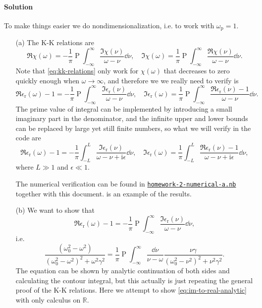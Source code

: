 \documentclass[hyperref, a4paper]{article}
\DeclareMathOperator{\primevalue}{P}
\newcommand*{\ii}{\mathrm{i}}
\begin{document}
\paragraph{Solution} To make things easier we do nondimensionalization, i.e. to work with $\omega_\text{p} = 1$.
\begin{itemize}
    \item[(a)] The K-K relations are
    \begin{equation}
        \Re \chi(\omega) = - \frac{1}{\pi} \primevalue \int_{-\infty}^\infty \frac{\Im \chi(\nu)}{\omega - \nu} \dd{\nu}, \quad \Im \chi(\omega) = \frac{1}{\pi} \primevalue \int_{-\infty}^\infty \frac{\Re \chi(\nu)}{\omega - \nu} \dd{\nu}.
        \label{eq:kk-relations}
    \end{equation}
    Note that \eqref{eq:kk-relations} only work for $\chi(\omega)$ that decreases to zero quickly enough when $\omega \to \infty$, and therefore we we really need to verify is 
    \[
        \Re \epsilon_\text{r}(\omega) - 1 = - \frac{1}{\pi} \primevalue \int_{-\infty}^\infty \frac{\Im \epsilon_\text{r}(\nu)}{\omega - \nu} \dd{\nu}, \quad \Im \epsilon_\text{r}(\omega) = \frac{1}{\pi} \primevalue \int_{-\infty}^\infty \frac{\Re \epsilon_\text{r}(\nu) - 1}{\omega - \nu} \dd{\nu}.
    \]
    The prime value of integral can be implemented by introducing a small imaginary part in the denominator, and the infinite upper and lower bounds can be replaced by large yet still finite numbers, so what we will verify in the code are
    \begin{equation}
        \Re \epsilon_\text{r}(\omega) - 1 = - \frac{1}{\pi} \int_{-L}^L \frac{\Im \epsilon_\text{r}(\nu)}{\omega - \nu + \ii \epsilon} \dd{\nu}, \quad \Im \epsilon_\text{r}(\omega) = \frac{1}{\pi} \int_{-L}^L \frac{\Re \epsilon_\text{r}(\nu) - 1}{\omega - \nu + \ii \epsilon} \dd{\nu},
        \label{eq:kk-program}
    \end{equation}
    where $L \gg 1$ and $\epsilon \ll 1$.

    The numerical verification can be found in \href{./homework-2-numerical-a.nb}{\texttt{homework-2-numerical-a.nb}} together with this document.
     is an example of the results.
    \item[(b)] We want to show that 
    \begin{equation}
        \Re \epsilon_\text{r}(\omega) - 1 = - \frac{1}{\pi} \primevalue \int_{-\infty}^\infty \frac{\Im \epsilon_\text{r}(\nu)}{\omega - \nu} \dd{\nu},
    \end{equation}
    i.e.
    \begin{equation}
        \frac{\left(\omega_{0}^{2}-\omega^{2}\right)}{\left(\omega_{0}^{2}-\omega^{2}\right)^{2}+\omega^{2} \gamma^{2}}= \frac{1}{\pi} \primevalue \int_{-\infty}^\infty \frac{\dd{\nu}}{\nu - \omega} \frac{ \nu \gamma}{\left(\omega_{0}^{2}-\nu^{2}\right)^{2}+\nu^{2} \gamma^{2}}.
        \label{eq:im-to-real-analytic}
    \end{equation} 
    The equation can be shown by analytic continuation of both sides and calculating the contour integral, but this actually is just repeating the general proof of the K-K relations.
    Here we attempt to show \eqref{eq:im-to-real-analytic} with only calculus on $\mathbb{R}$.


\end{itemize}
\end{document}
